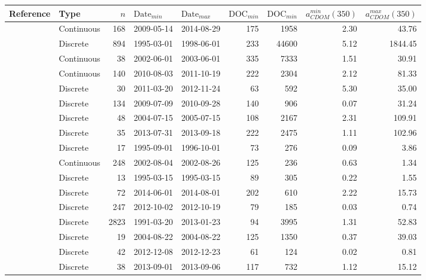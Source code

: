 \begingroup\footnotesize
\begin{longtable}{llrllrrrr}
  \hline
Reference & Type & $n$ & $\text{Date}_{min}$ & $\text{Date}_{max}$ & $\text{DOC}_{min}$ & $\text{DOC}_{min}$ & $a_{CDOM}^{min}(350)$ & $a_{CDOM}^{max}(350)$ \\ 
  \hline
\citet{agro} & Continuous & 168 & 2009-05-14 & 2014-08-29 & 175 & 1958 & 2.30 & 43.76 \\ 
  \citet{Aiken2005} & Discrete & 894 & 1995-03-01 & 1998-06-01 & 233 & 44600 & 5.12 & 1844.45 \\ 
  \citet{Anderson2007} & Continuous &  38 & 2002-06-01 & 2003-06-01 & 335 & 7333 & 1.51 & 30.91 \\ 
  \citet{Asmala2016} & Continuous & 140 & 2010-08-03 & 2011-10-19 & 222 & 2304 & 2.12 & 81.33 \\ 
  \citet{Bouillon2014} & Discrete &  30 & 2011-03-20 & 2012-11-24 & 63 & 592 & 5.30 & 35.00 \\ 
  \citet{Braun2015} & Discrete & 134 & 2009-07-09 & 2010-09-28 & 140 & 906 & 0.07 & 31.24 \\ 
  \citet{Breton2009} & Discrete &  48 & 2004-07-15 & 2005-07-15 & 108 & 2167 & 2.31 & 109.91 \\ 
  \citet{Brezonik2015} & Discrete &  35 & 2013-07-31 & 2013-09-18 & 222 & 2475 & 1.11 & 102.96 \\ 
  \citet{Castillo1999} & Discrete &  17 & 1995-09-01 & 1996-10-01 & 73 & 276 & 0.09 & 3.86 \\ 
  \citet{Conan2007} & Continuous & 248 & 2002-08-04 & 2002-08-26 & 125 & 236 & 0.63 & 1.34 \\ 
  \citet{Delcastillo2000} & Discrete &  13 & 1995-03-15 & 1995-03-15 & 89 & 305 & 0.22 & 1.55 \\ 
  \citet{DeVilbiss2016} & Discrete &  72 & 2014-06-01 & 2014-08-01 & 202 & 610 & 2.22 & 15.73 \\ 
  \citet{Engel2015} & Discrete & 247 & 2012-10-02 & 2012-10-19 & 79 & 185 & 0.03 & 0.74 \\ 
  \citet{Finishriver2016} & Discrete & 2823 & 1991-03-20 & 2013-01-23 & 94 & 3995 & 1.31 & 52.83 \\ 
  \citet{Forsstrom2015} & Discrete &  19 & 2004-08-22 & 2004-08-22 & 125 & 1350 & 0.37 & 39.03 \\ 
  \citet{Galgani2016} & Discrete &  42 & 2012-12-08 & 2012-12-23 & 61 & 124 & 0.02 & 0.81 \\ 
  \citet{Goncalves2015} & Discrete &  38 & 2013-09-01 & 2013-09-06 & 117 & 732 & 1.12 & 15.12 \\ 

\end{longtable}
